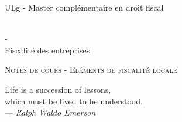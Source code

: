 \documentclass{book}
\begin{document}
\sffamily
\newcommand{\RPoint}{\protect\texttt{[image: point.png]}}
\newcommand{\RSave}{\protect\texttt{[image: Save.png]}}
\renewcommand\labelitemii{\ding{220}}
\begin{titlepage}

\begin{center}
\begin{Large}ULg - Master complémentaire en droit fiscal\end{Large}\\
\vspace{0.5cm}- \\
\vspace{0.5cm}
Fiscalité des entreprises

\end{center}
\vspace{6cm}

\LARGE
\begin{center}
\textsc{Notes de cours - Eléments de fiscalité locale}\\
\end{center}

\vspace{10.0cm}

\normalsize
{}

\end{titlepage}

\newpage

\thispagestyle{empty}
\setcounter{page}{0}
\null

\newpage
\thispagestyle{empty}
\setcounter{page}{0}
\vspace{20cm}

\vfill
\begin{flushright}
Life is a succession of lessons, \\
which must be lived to be understood. \\ 
--- \textit{Ralph Waldo Emerson}
\end{flushright}
\vfill
\newpage

\renewcommand{\chaptermark}[1]{\markboth{#1}{}}
\renewcommand{\sectionmark}[1]{\markright{\thesection\ #1}}
\fancyhf{} \fancyhead[LE,RO]{\bfseries\thepage}
\fancyhead[LO]{\bfseries\rightmark}
\fancyhead[RE]{\bfseries\leftmark}
\renewcommand{\headrulewidth}{0.5pt}
\addtolength{\headheight}{0.5pt}
\renewcommand{\footrulewidth}{0pt}
\fancypagestyle{plain}{ \fancyhead{}
\renewcommand{\headrulewidth}{0pt}}
\end{document}
